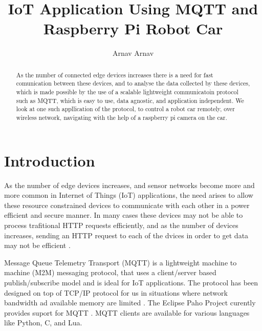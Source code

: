 \documentclass[sigconf]{acmart}
\begin{document}
\title{IoT Application Using MQTT and Raspberry Pi Robot Car}

\author{Arnav Arnav}




\begin{abstract}
As the number of connected edge devices increases there is a need for fast 
comunication between these devices, and to analyse the data collected by
these devices, which is made possible by the use of a scalable lightweight 
communicatoin protocol such as MQTT, which is easy to use, data agnostic, and 
application independent.
We look at one such appllication of the protocol, to control a robot car remotely,
over wireless network, navigating with the help of a raspberry pi camera on the car.

\end{abstract}



\maketitle


\section{Introduction}

As the number of edge devices increases, and sensor networks become more and more common in Internet of Things (IoT) applications, the need arises to allow these resource constrained devices to communicate with each other in a power efficient and secure manner. In many cases these devices may not be able to process trafitional HTTP requests efficiently, and as the number of devices increases, sending an HTTP request to each of the dvices in order to get data may not be efficient \cite{mqtt-vs-http}\cite{hivemq-website}.

Message Queue Telemetry Transport (MQTT) is a lightweight  machine to machine (M2M) messaging protocol, that uses a client/server based publish/subscribe model and is ideal for IoT applications. The protocol has been designed on top of TCP/IP protocol for us in situations where network bandwidth ad available memory are limited \cite{mqtt-wiki}\cite{mqtt-official}.
The Eclipse Paho Project curently provides suport for MQTT \cite{eclipse-mosquitto}. MQTT clients are available for various languages like Python, C, and Lua.
\end{document}
